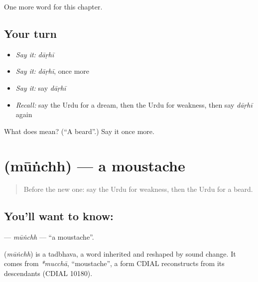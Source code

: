 \begin{grammarlens}[title={What you've built}]
One more word for this chapter.
\end{grammarlens}

\subsection*{Your turn}
\begin{itemize}
\raggedright
  \item \emph{Say it:} \emph{dāṛhī}
  \item \emph{Say it:} \emph{dāṛhī}, once more
  \item \emph{Say it:} say \emph{dāṛhī}
  \item \emph{Recall:} say the Urdu for a dream, then the Urdu for weakness, then say \emph{dāṛhī} again
\end{itemize}

\begin{tcolorbox}[breakable,colback=teal!4,colframe=teal!35!black,title={Before you move on}]
What does  mean? (\textquotedblleft{}A beard\textquotedblright{}.) Say it once more.
\end{tcolorbox}
\section[\texorpdfstring{\ur{مونچھ} (mūṅchh)}{مونچھ (mūṅchh)}]{ (mūṅchh) — a moustache}

\label{lesson:UR-C217-munchh}



\begin{quote}
Before the new one: say the Urdu for weakness, then the Urdu for a beard.
\end{quote}

\subsection*{You'll want to know: }
\textbf{} — \emph{mūṅchh} — \textquotedblleft{}a moustache\textquotedblright{}.

\begin{cousinweb}
\textbf{} (\emph{mūṅchh}) is a tadbhava, a word inherited and reshaped by sound change. It comes from \emph{*mucchā}, \textquotedblleft{}moustache\textquotedblright{}, a form CDIAL reconstructs from its descendants (CDIAL 10180).
\end{cousinweb}

